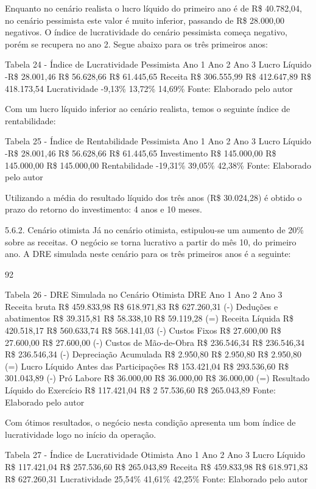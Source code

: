 Enquanto no cenário realista o lucro líquido do primeiro ano é de R\$ 40.782,04, no cenário pessimista este valor é muito inferior, passando de R\$ 28.000,00 negativos. 
O índice de lucratividade do cenário pessimista começa negativo, porém se recupera no ano 2. Segue abaixo para os três primeiros anos:  

Tabela 24 - Índice de Lucratividade Pessimista 
Ano 1	Ano 2	Ano 3
Lucro Líquido	-R\$     28.001,46	R\$     56.628,66	R\$     61.445,65
Receita	R\$   306.555,99	R\$   412.647,89	R\$   418.173,54
Lucratividade	-9,13\%	13,72\%	14,69\%
Fonte: Elaborado pelo autor 

Com um lucro líquido inferior ao cenário realista, temos o seguinte índice de rentabilidade: 

Tabela 25 - Índice de Rentabilidade Pessimista 
Ano 1	Ano 2	Ano 3
Lucro Líquido	-R\$     28.001,46	R\$     56.628,66	R\$     61.445,65
Investimento	R\$   145.000,00	R\$   145.000,00	R\$   145.000,00
Rentabilidade	-19,31\%	39,05\%	42,38\%
Fonte: Elaborado pelo autor 

Utilizando a média do resultado líquido dos três anos (R\$ 30.024,28) é obtido o prazo do retorno do investimento: 4 anos e 10 meses. 

5.6.2. Cenário otimista 
Já no cenário otimista, estipulou-se um aumento de 20\% sobre as receitas. O negócio se torna lucrativo a partir do mês 10, do primeiro ano. 
A DRE simulada neste cenário para os três primeiros anos é a seguinte: 

92 

Tabela 26 - DRE Simulada no Cenário Otimista 
DRE	Ano 1	Ano 2	Ano 3
Receita bruta	R\$   459.833,98	R\$   618.971,83	R\$   627.260,31
(-) Deduções e abatimentos	R\$     39.315,81	R\$     58.338,10	R\$     59.119,28
(=) Receita Líquida	R\$   420.518,17	R\$   560.633,74	R\$   568.141,03
(-) Custos Fixos	R\$     27.600,00	R\$     27.600,00	R\$     27.600,00
(-) Custos de Mão-de-Obra	R\$   236.546,34	R\$   236.546,34	R\$   236.546,34
(-) Depreciação Acumulada	R\$       2.950,80	R\$       2.950,80	R\$       2.950,80
(=) Lucro Líquido Antes das 
Participações	R\$   153.421,04	R\$   293.536,60	R\$   301.043,89
(-) Pró Labore	R\$     36.000,00	R\$     36.000,00	R\$     36.000,00
(=) Resultado Líquido do 
Exercício	R\$   117.421,04	R\$  2 57.536,60	R\$   265.043,89
Fonte: Elaborado pelo autor 

Com ótimos resultados, o negócio nesta condição apresenta um bom índice de lucratividade logo no início da operação. 

Tabela 27 - Índice de Lucratividade Otimista 
Ano 1	Ano 2	Ano 3
Lucro Líquido	R\$   117.421,04	R\$   257.536,60	R\$   265.043,89
Receita	R\$   459.833,98	R\$   618.971,83	R\$   627.260,31
Lucratividade	25,54\%	41,61\%	42,25\%
Fonte: Elaborado pelo autor 

